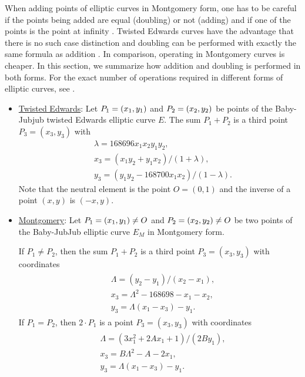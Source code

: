 When adding points of elliptic curves %
in Montgomery form,  
one has to be careful if the points being added are equal (doubling) or not (adding) and if one of the points is the point at infinity \cite{montgomery}. 
%
Twisted Edwards curves have the advantage that there is no such case distinction and doubling can be performed with exactly the same formula as addition \cite{twisted}. 
%
In comparison, operating in Montgomery curves is cheaper. In this section, we summarize how addition and doubling is performed in both forms. 
%
For the exact number of operations required in different forms of elliptic curves, see \cite{operations-cost}.

\begin{itemize}
	
	\item \underline{Twisted Edwards}: 	
	Let $P_{1} = (x_{1}, y_{1})$ and $P_{2} = (x_{2}, y_{2})$ be points of the Baby-Jubjub twisted Edwards elliptic curve $E$. The sum $P_1 + P_2$ is a third point $P_3 = (x_3, y_3)$ with 
		\begin{align*}
			&\lambda = 168696 x_1x_2y_1y_2,\\
			&x_3 = (x_1y_2 + y_1x_2) / (1 + \lambda),\\
			&y_3 = (y_1y_2 - 168700 x_1x_2) / (1 - \lambda).
		\end{align*}
	Note that the neutral element is the point $O = (0,1)$ and the inverse of a point $(x,y)$ is $(-x,y)$.

	\item \underline{Montgomery}: 
	Let $P_{1} = (x_{1}, y_{1})\not=O$ and $P_{2} = (x_{2}, y_{2})\not=O$ be two points of the Baby-JubJub elliptic curve $E_M$ in Montgomery form. 
	
	If $P_1\not=P_2$, then the sum $P_1 + P_2$ is a third point $P_3 = (x_3, y_3)$ with coordinates
		\begin{align}
		\label{eq-ted}
		\begin{split}
			&\Lambda = (y_2-y_1)/ (x_2-x_1),\\
			&x_3 = \Lambda^2 - 168698 - x_1 - x_2,\\
			&y_3 = \Lambda(x_1- x_3) - y_1.
		\end{split}
		\end{align}
	If $P_1 = P_2$, then $2\cdot P_1$ is a point $P_3 = (x_3, y_3)$ with coordinates
		\begin{align}
		\label{eq-mont}
		\begin{split}
			&\Lambda = (3x_1^2 + 2Ax_1 + 1)/ (2By_1),\\
			&x_3 = B\Lambda^2 - A - 2x_1,\\
			&y_3 = \Lambda(x_1- x_3) - y_1.
		\end{split}	
		\end{align}
	
\end{itemize}